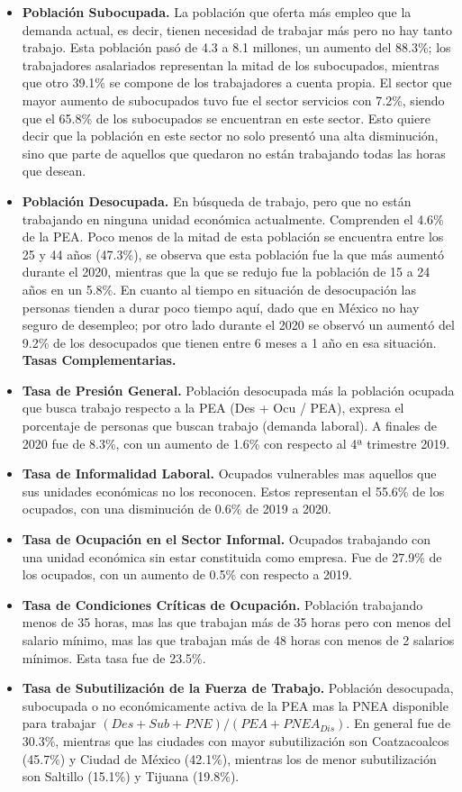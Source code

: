 \begin{itemize}
    \item \textbf{Población Subocupada.} La población que oferta más empleo que la demanda actual, es decir, tienen necesidad de trabajar más pero no hay tanto trabajo. Esta población pasó de 4.3 a 8.1 millones, un aumento del 88.3\%; los trabajadores asalariados representan la mitad de los subocupados, mientras que otro 39.1\% se compone de los trabajadores a cuenta propia. El sector que mayor aumento de subocupados tuvo fue el sector servicios con 7.2\%, siendo que el 65.8\% de los subocupados se encuentran en este sector. Esto quiere decir que la población en este sector no solo presentó una alta disminución, sino que parte de aquellos que quedaron no están trabajando todas las horas que desean.
    \item \textbf{Población Desocupada.} En búsqueda de trabajo, pero que no están trabajando en ninguna unidad económica actualmente. Comprenden el 4.6\% de la PEA. Poco menos de la mitad de esta población se encuentra entre los 25 y 44 años (47.3\%), se observa que esta población fue la que más aumentó durante el 2020, mientras que la que se redujo fue la población de 15 a 24 años en un 5.8\%. En cuanto al tiempo en situación de desocupación las personas tienden a durar poco tiempo aquí, dado que en México no hay seguro de desempleo; por otro lado durante el 2020 se observó un aumentó del 9.2\% de los desocupados que tienen entre 6 meses a 1 año en esa situación.\\
    
    \textbf{Tasas Complementarias.}
    \item \textbf{Tasa de Presión General.} Población desocupada más la población ocupada que busca trabajo respecto a la PEA (Des + Ocu / PEA), expresa el porcentaje de personas que buscan trabajo (demanda laboral). A finales de 2020 fue de 8.3\%, con un aumento de 1.6\% con respecto al 4ª trimestre 2019. 
    \item \textbf{Tasa de Informalidad Laboral.} Ocupados vulnerables mas aquellos que sus unidades económicas no los reconocen. Estos representan el 55.6\% de los ocupados, con una disminución de 0.6\% de 2019 a 2020.
    \item \textbf{Tasa de Ocupación en el Sector Informal.} Ocupados trabajando con una unidad económica sin estar constituida como empresa. Fue de 27.9\% de los ocupados, con un aumento de 0.5\% con respecto a 2019.
    \item \textbf{Tasa de Condiciones Críticas de Ocupación.} Población trabajando menos de 35 horas, mas las que trabajan más de 35 horas pero con menos del salario mínimo, mas las que trabajan más de 48 horas con menos de 2 salarios mínimos. Esta tasa fue de 23.5\%.
    \item \textbf{Tasa de Subutilización de la Fuerza de Trabajo.} Población desocupada, subocupada o no económicamente activa de la PEA mas la PNEA disponible para trabajar $(Des + Sub + PNE) / (PEA + PNEA_{Dis})$. En general fue de 30.3\%, mientras que las ciudades con mayor subutilización son Coatzacoalcos (45.7\%) y Ciudad de México (42.1\%), mientras los de menor subutilización son Saltillo (15.1\%) y Tijuana (19.8\%).
\end{itemize}


